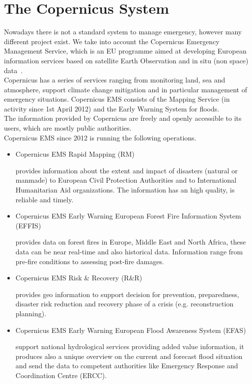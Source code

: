 \section{The Copernicus System}
\noindent Nowadays there is not a standard system to manage emergency, however many different project exist. We take into account the Copernicus Emergency Management Service, which is an EU programme aimed at developing European information services based on satellite Earth Observation and in situ (non space) data~\cite{copernicus}.
\\
\noindent Copernicus has a series of services ranging from monitoring land, sea and atmosphere, support climate change mitigation and in particular management of emergency situations. Copernicus EMS consists of the Mapping Service (in activity since 1st April 2012) and the Early Warning System for floods.
\\
\noindent The information provided by Copernicus are freely and openly accessible to its users, which are mostly public authorities.
\\
\noindent Copernicus EMS since 2012 is running the following operations.

\begin{itemize}
\item   Copernicus EMS Rapid Mapping (RM)

        provides information about the extent and impact of disasters (natural or manmade) to European Civil Protection Authorities and to International Humanitarian Aid organizations. The information has an high quality, is reliable and timely.
        
\item   Copernicus EMS Early Warning European Forest Fire Information System (EFFIS)

        provides data on forest fires in Europe, Middle East and North Africa, these data can be near real-time and also historical data. Information range from pre-fire conditions to assessing post-fire damages.
        
\newpage

\item   Copernicus EMS Risk \& Recovery (R\&R)

        provides geo information to support decision for prevention, preparedness, disaster risk reduction and recovery phase of a crisis (e.g. reconstruction planning).
        
\item   Copernicus EMS Early Warning European Flood Awareness System (EFAS)

        support national hydrological services providing added value information, it produces also a unique overview on the current and forecast flood situation and send the data to competent authorities like Emergency Response and Coordination Centre (ERCC).
        
\end{itemize}

